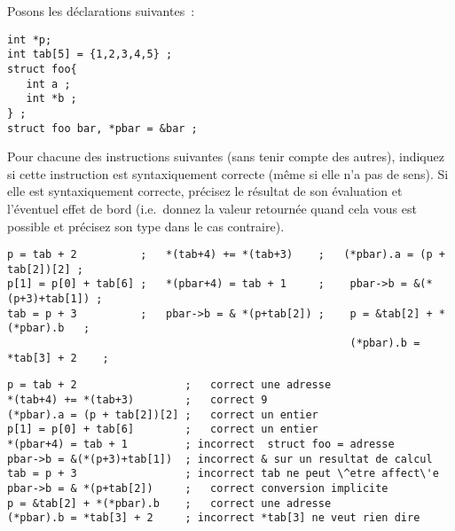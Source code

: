 Posons les d\'eclarations suivantes~:
\begin{verbatim}
int *p;
int tab[5] = {1,2,3,4,5} ;
struct foo{
   int a ;
   int *b ;
} ;
struct foo bar, *pbar = &bar ;
\end{verbatim}
Pour chacune des instructions suivantes (sans tenir compte des
autres), indiquez si cette instruction est syntaxiquement correcte
(m\^eme si elle n'a pas de sens). Si elle est syntaxiquement correcte,
pr\'ecisez le r\'esultat de son \'evaluation et l'\'eventuel effet de
bord (i.e.\ donnez la valeur retourn\'ee quand cela vous est possible
et pr\'ecisez son type dans le cas contraire).
\begin{verbatim}
p = tab + 2          ;   *(tab+4) += *(tab+3)    ;   (*pbar).a = (p + tab[2])[2] ;
p[1] = p[0] + tab[6] ;   *(pbar+4) = tab + 1     ;    pbar->b = &(*(p+3)+tab[1]) ;   
tab = p + 3          ;   pbar->b = & *(p+tab[2]) ;    p = &tab[2] + *(*pbar).b   ;
                                                      (*pbar).b = *tab[3] + 2    ;
\end{verbatim}
\ifcorrection
\begin{verbatim}
p = tab + 2                 ;   correct une adresse 
*(tab+4) += *(tab+3)        ;   correct 9
(*pbar).a = (p + tab[2])[2] ;   correct un entier 
p[1] = p[0] + tab[6]        ;   correct un entier
*(pbar+4) = tab + 1         ; incorrect  struct foo = adresse
pbar->b = &(*(p+3)+tab[1])  ; incorrect & sur un resultat de calcul
tab = p + 3                 ; incorrect tab ne peut \^etre affect\'e
pbar->b = & *(p+tab[2])     ;   correct conversion implicite
p = &tab[2] + *(*pbar).b    ;   correct une adresse
(*pbar).b = *tab[3] + 2     ; incorrect *tab[3] ne veut rien dire
\end{verbatim}
\fi
